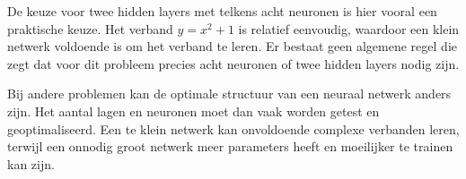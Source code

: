 \documentclass{ximera}
\begin{document}
\begin{remark} \text{ }
    
De keuze voor twee hidden layers met telkens acht neuronen is hier vooral een praktische keuze. Het verband $y=x^2+1$ is relatief eenvoudig, waardoor een klein netwerk voldoende is om het verband te leren. Er bestaat geen algemene regel die zegt dat voor dit probleem precies acht neuronen of twee
hidden layers nodig zijn.

Bij andere problemen kan de optimale structuur van een neuraal netwerk anders zijn. Het aantal lagen en neuronen moet dan vaak worden getest en geoptimaliseerd. Een te klein netwerk kan onvoldoende complexe verbanden leren, terwijl een onnodig groot netwerk meer parameters
heeft en moeilijker te trainen kan zijn.

\end{remark}
\end{document}
